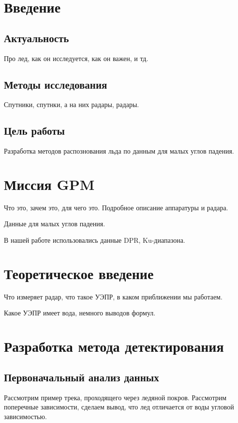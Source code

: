 



\section*{Введение}
\subsection*{Актуальность}
Про лед, как он исследуется, как он важен, и тд.

\subsection*{Методы исследования}
Спутники, спутнки, а на них радары, радары.

\subsection*{Цель работы}
Разработка методов распознования льда по данным для малых углов падения. 

\section*{Миссия GPM}
Что это, зачем это, для чего это. Подробное описание аппаратуры и радара.

Данные для малых углов падения.

В нашей работе использовались данные DPR, Ku-диапазона.

\section*{Теоретическое введение}

Что измеряет радар, что такое УЭПР, в каком приближении мы работаем.

Какое УЭПР имеет вода, немного выводов формул.

\section*{Разработка метода детектирования}

\subsection*{Первоначальный анализ данных}
Рассмотрим пример трека, проходящего через ледяной покров. Рассмотрим поперечные зависимости, сделаем вывод, что лед
отличается от воды угловой зависимостью.

